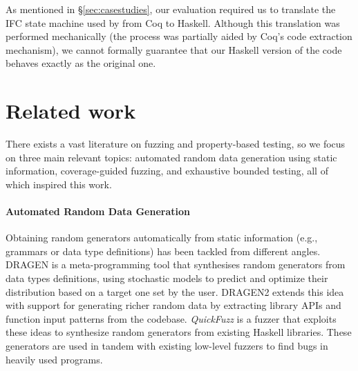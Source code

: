 \documentclass[sigconf,review,anonymous]{acmart}
\begin{document}
As mentioned in \S \ref{sec:casestudies}, our evaluation required us to
translate the IFC state machine used by \citeauthor{lampropoulos2019coverage}
from Coq to Haskell. 
%
Although this translation was performed mechanically (the process was partially
aided by Coq's code extraction mechanism), we cannot formally guarantee that our
Haskell version of the code behaves exactly as the original one. 
%


%



\section{Related work}
\label{sec:related}

There exists a vast literature on fuzzing and property-based testing, so we
focus on three main relevant topics:
%
automated random data generation using static information,
%
coverage-guided fuzzing, and
%
exhaustive bounded testing, all of which inspired this work.


\paragraph{Automated Random Data Generation}

Obtaining random generators automatically from static information (e.g.,
grammars or data type definitions) has been tackled from different angles.
%
DRAGEN \cite{DBLP:conf/haskell/MistaRH18} is a meta-programming tool that
synthesises random generators from data types definitions, using stochastic
models to predict and optimize their distribution based on a target one set by
the user.
%
DRAGEN2 \cite{Mista2019GeneratingRS} extends this idea with support for
generating richer random data by extracting library APIs and function input
patterns from the codebase.
%
%
%
%
\emph{QuickFuzz} \cite{GriecoCB16, grieco2017} is a fuzzer that exploits these
ideas to synthesize random generators from existing Haskell libraries. These
generators are used in tandem with existing low-level fuzzers to find bugs in
heavily used programs.
\end{document}
